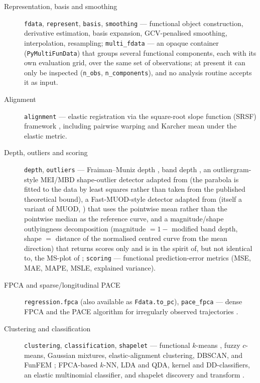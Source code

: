 \begin{description}
  \item[Representation, basis and smoothing]
    \texttt{fdata}, \texttt{represent}, \texttt{basis}, \texttt{smoothing} ---
    functional object construction, derivative estimation, basis expansion,
    GCV-penalised smoothing, interpolation, resampling;
    \texttt{multi\_fdata} --- an opaque container (\texttt{PyMultiFunData})
    that groups several functional components, each with its own evaluation
    grid, over the same set of observations; at present it can only be
    inspected (\texttt{n\_obs}, \texttt{n\_components}), and no analysis
    routine accepts it as input.

  \item[Alignment]
    \texttt{alignment} --- elastic registration via the square-root slope
    function (SRSF) framework \citep{srivastava_et_al_2011}, including
    pairwise warping and Karcher mean under the elastic metric.

  \item[Depth, outliers and scoring]
    \texttt{depth}, \texttt{outliers} --- Fraiman--Muniz
    depth \citep{fraiman_muniz_2001}, band depth
    \citep{lopez_pintado_romo_2009}, an outliergram-style MEI/MBD shape-outlier
    detector adapted from \citet{arribas_gil_romo_2014} (the parabola is fitted
    to the data by least squares rather than taken from the published
    theoretical bound), a Fast-MUOD-style detector adapted from
    \citet{ojo_fast_muod_2022} (itself a variant of MUOD,
    \citealp{azcorra_muod_2018}) that uses the pointwise mean rather than the
    pointwise median as the reference curve, and a magnitude/shape outlyingness
    decomposition (magnitude $= 1 -$ modified band depth, shape $=$ distance
    of the normalised centred curve from the mean direction) that returns
    scores only and is in the spirit of, but not identical to, the MS-plot of
    \citet{dai_genton_2018};
    \texttt{scoring} --- functional prediction-error metrics (MSE, MAE, MAPE,
    MSLE, explained variance).

  \item[FPCA and sparse/longitudinal PACE]
    \texttt{regression.fpca} (also available as \texttt{Fdata.to\_pc}),
    \texttt{pace\_fpca} ---
    dense FPCA and the PACE algorithm for irregularly observed trajectories
    \citep{yao_muller_wang_2005}.

  \item[Clustering and classification]
    \texttt{clustering}, \texttt{classification}, \texttt{shapelet} ---
    functional $k$-means \citep{tarpey_kinateder_2003}, fuzzy $c$-means,
    Gaussian mixtures, elastic-alignment clustering, DBSCAN, and FunFEM \citep{bouveyron_et_al_2015};
    FPCA-based $k$-NN, LDA and QDA, kernel and DD-classifiers, an elastic
    multinomial classifier, and shapelet discovery and transform
    \citep{ye_keogh_2009}.


\end{description}
